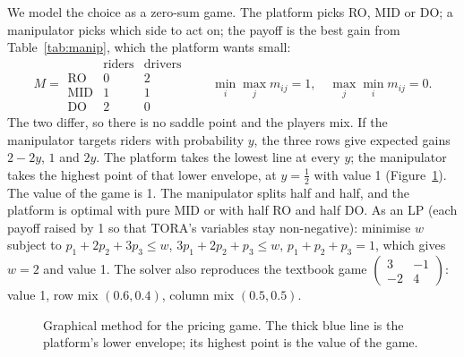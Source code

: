 \documentclass[11pt,a4paper]{article}
\begin{document}
We model the choice as a zero-sum game. The platform picks RO, MID or DO; a manipulator picks which side to act on; the payoff is the best gain from Table~\ref{tab:manip}, which the platform wants small:
\[
M=\begin{array}{c|cc}
 & \text{riders} & \text{drivers}\\\hline
\text{RO} & 0 & 2\\
\text{MID} & 1 & 1\\
\text{DO} & 2 & 0
\end{array}
\qquad
\min_i\max_j m_{ij}=1,\quad \max_j\min_i m_{ij}=0 .
\]
The two differ, so there is no saddle point and the players mix. If the manipulator targets riders with probability $y$, the three rows give expected gains $2-2y$, $1$ and $2y$. The platform takes the lowest line at every $y$; the manipulator takes the highest point of that lower envelope, at $y=\tfrac12$ with value 1 (Figure~\ref{fig:game}). The value of the game is 1. The manipulator splits half and half, and the platform is optimal with pure MID or with half RO and half DO. As an LP (each payoff raised by 1 so that TORA's variables stay non-negative): minimise $w$ subject to $p_1+2p_2+3p_3\le w$, $3p_1+2p_2+p_3\le w$, $p_1+p_2+p_3=1$, which gives $w=2$ and value 1. The solver also reproduces the textbook game $\begin{pmatrix}3&-1\\-2&4\end{pmatrix}$: value 1, row mix $(0.6,0.4)$, column mix $(0.5,0.5)$.

\begin{figure}[h]
\centering
{}
\caption{Graphical method for the pricing game. The thick blue line is the platform's lower envelope; its highest point is the value of the game.}
\label{fig:game}
\end{figure}
\end{document}
